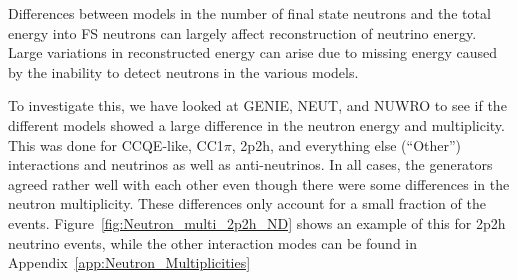 \documentclass[12pt]{article}
\begin{document}
Differences between models in the number of final state neutrons and the total energy into FS neutrons can largely affect reconstruction of neutrino energy. Large variations in reconstructed energy can arise due to missing energy caused by the inability to detect neutrons in the various models.  

To investigate this, we have looked at GENIE, NEUT, and NUWRO to see if the different models showed a large difference in the neutron energy and multiplicity.  
This was done for CCQE-like, CC1$\pi$, 2p2h, and everything else (``Other'') interactions and neutrinos as well as anti-neutrinos.  
In all cases, the generators agreed rather well with each other even though there were some differences in the neutron multiplicity. 
These differences only account for a small fraction of the events.
Figure~\ref{fig:Neutron_multi_2p2h_ND} shows an example of this for 2p2h neutrino events, while the other interaction modes can be found in Appendix~\ref{app:Neutron_Multiplicities}
  
\end{document}
